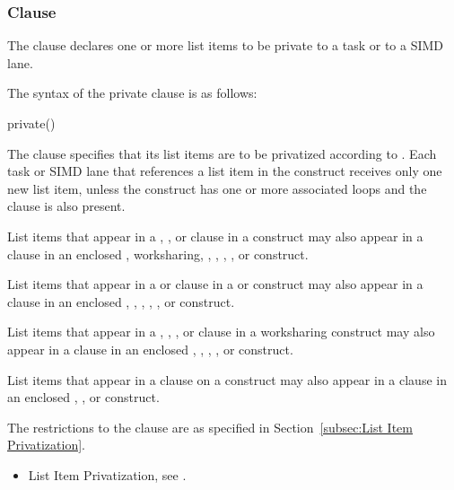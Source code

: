 \subsubsection{ Clause}
\label{subsubsec:private clause}
\summary
The  clause declares one or more list items to be private to a task or to a
SIMD lane.

\syntax
The syntax of the private clause is as follows:

\begin{ompSyntax}
private()
\end{ompSyntax}

\descr

The  clause specifies that its list items are to be
privatized according to . Each task
or SIMD lane that references a list item in the construct receives only one
new list item, unless the construct has one or more associated loops and the
 clause is also present.

List items that appear in a , , or
 clause in a  construct may also appear
in a  clause in an enclosed ,
worksharing, , , , , or
 construct.

List items that appear in a  or 
clause in a  or  construct may also appear in a 
clause in an enclosed , , , , , or
 construct.

List items that appear in a , ,
, or  clause in a worksharing
construct may also appear in a  clause in an enclosed
, , , , or  construct.

List items that appear in a  clause on a  construct
may also appear in a  clause in an enclosed , 
, or  construct.

\restrictions
The restrictions to the  clause are as specified in
Section~\ref{subsec:List Item Privatization}.

\crossreferences
\begin{itemize}
    \item List Item Privatization, see .
\end{itemize}



